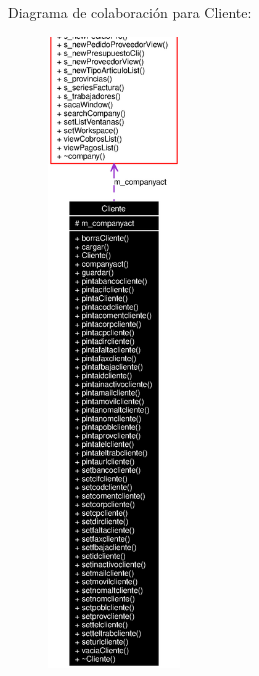 Diagrama de colaboraci\'{o}n para Cliente:\begin{figure}[H]
\begin{center}
\leavevmode
\includegraphics[width=99pt]{classCliente__coll__graph}
\end{center}
\end{figure}
